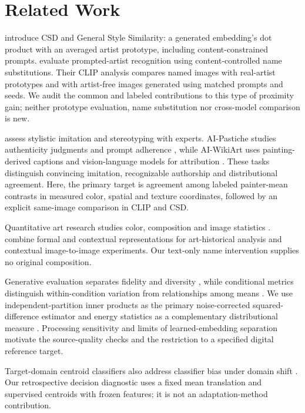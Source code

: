 \section{Related Work}
\citet{somepalli2024style} introduce CSD and General Style Similarity: a generated
embedding's dot product with an averaged artist prototype, including
content-constrained prompts. \citet{su2025prompted} evaluate prompted-artist
recognition using content-controlled name substitutions. Their CLIP analysis
compares named images with real-artist prototypes and with artist-free images
generated using matched prompts and seeds.
We audit the common and labeled contributions to this type of proximity gain;
neither prototype evaluation, name substitution nor cross-model comparison is new.

\citet{deliege2025} assess stylistic imitation and stereotyping with experts.
AI-Pastiche studies authenticity judgments and prompt adherence
\citep{asperti2025pastiche}, while AI-WikiArt uses painting-derived captions and
vision-language models for attribution \citep{fu2025aiwikiart}. These tasks
distinguish convincing imitation, recognizable authorship and distributional
agreement. Here, the primary target is agreement among labeled painter-mean contrasts
in measured color, spatial and texture coordinates, followed by an explicit
same-image comparison in CLIP and CSD.

Quantitative art research studies color, composition and image statistics
\citep{kim2014,sigaki2018,lee2020}. \citet{kim2026} combine formal and contextual
representations for art-historical analysis and contextual image-to-image
experiments. Our text-only name intervention supplies no original composition.

Generative evaluation separates fidelity and diversity \citep{naeem2020},
while conditional metrics distinguish within-condition variation from relationships
among means \citep{benny2021conditional}. We use independent-partition inner products
as the primary noise-corrected squared-difference estimator \citep{diedrichsen2017representational}
and energy statistics as a complementary distributional measure \citep{szekely2013}.
Processing sensitivity \citep{parmar2022} and limits of learned-embedding
separation \citep{asperti2026} motivate the source-quality checks and the
restriction to a specified digital reference target.

Target-domain centroid classifiers also address classifier bias under domain
shift \citep{liang2021atdoc}. Our retrospective decision diagnostic uses a fixed
mean translation and supervised centroids with frozen features; it is not an
adaptation-method contribution.

